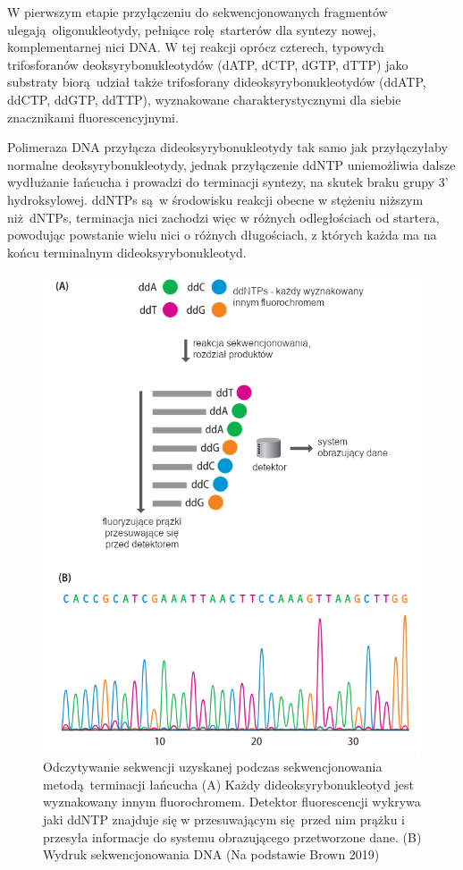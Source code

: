 \documentclass[two column, twoside, a4paper]{article}
\begin{document}
W pierwszym etapie przyłączeniu do sekwencjonowanych fragmentów ulegają oligonukleotydy, pełniące rolę starterów dla syntezy nowej, komplementarnej nici DNA. W tej reakcji oprócz czterech, typowych trifosforanów deoksyrybonukleotydów (dATP, dCTP, dGTP, dTTP) jako substraty biorą udział także trifosforany dideoksyrybonukleotydów (ddATP, ddCTP, ddGTP, ddTTP), wyznakowane charakterystycznymi dla siebie znacznikami fluorescencyjnymi.

Polimeraza DNA przyłącza dideoksyrybonukleotydy tak samo jak przyłączyłaby normalne deoksyrybonukleotydy, jednak przyłączenie ddNTP uniemożliwia dalsze wydłużanie łańcucha i prowadzi do terminacji syntezy, na skutek braku grupy 3' hydroksylowej. ddNTPs są w środowisku reakcji obecne w stężeniu niższym niż dNTPs, terminacja nici zachodzi więc w różnych odległościach od startera, powodując powstanie wielu nici o różnych długościach, z których każda ma na końcu terminalnym dideoksyrybonukleotyd.

\begin{figure}[h]
\begin{tcolorbox}
	\centering
	\includegraphics[width=\textwidth]{./figury/sekwencja_metoda_terminacji.png}
	\caption{Odczytywanie sekwencji uzyskanej podczas sekwencjonowania metodą terminacji łańcucha (A) Każdy dideoksyrybonukleotyd jest wyznakowany innym fluorochromem. Detektor fluorescencji wykrywa jaki ddNTP znajduje się w przesuwającym się przed nim prążku i przesyła informacje do systemu obrazującego przetworzone dane. (B) Wydruk sekwencjonowania DNA (Na podstawie Brown 2019)}\label{fig::seq_chain_term}
\end{tcolorbox}
\end{figure}
\end{document}
